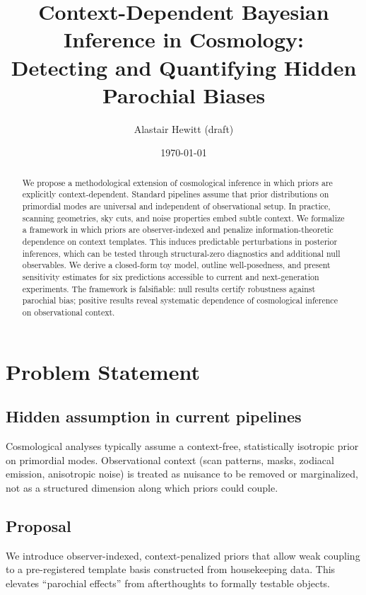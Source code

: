 \documentclass[11pt]{article}
\title{Context-Dependent Bayesian Inference in Cosmology:\\
Detecting and Quantifying Hidden Parochial Biases}
\author{Alastair Hewitt (draft)}
\date{\today}
\begin{document}
\maketitle

\begin{abstract}
We propose a methodological extension of cosmological inference in which priors are explicitly context-dependent. Standard pipelines assume that prior distributions on primordial modes are universal and independent of observational setup. In practice, scanning geometries, sky cuts, and noise properties embed subtle context. We formalize a framework in which priors are observer-indexed and penalize information-theoretic dependence on context templates. This induces predictable perturbations in posterior inferences, which can be tested through structural-zero diagnostics and additional null observables. We derive a closed-form toy model, outline well-posedness, and present sensitivity estimates for six predictions accessible to current and next-generation experiments. The framework is falsifiable: null results certify robustness against parochial bias; positive results reveal systematic dependence of cosmological inference on observational context.
\end{abstract}

\tableofcontents

\section{Problem Statement}

\subsection{Hidden assumption in current pipelines}
Cosmological analyses typically assume a context-free, statistically isotropic prior on primordial modes. Observational context (scan patterns, masks, zodiacal emission, anisotropic noise) is treated as nuisance to be removed or marginalized, not as a structured dimension along which priors could couple.

\subsection{Proposal}
We introduce observer-indexed, context-penalized priors that allow weak coupling to a pre-registered template basis constructed from housekeeping data. This elevates ``parochial effects'' from afterthoughts to formally testable objects.
\end{document}
